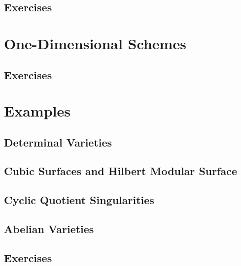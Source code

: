 \subsection{}
\subsection{}
\subsection{Exercises}

\section{One-Dimensional Schemes}

\subsection{}
\subsection{}
\subsection{}
\subsection{}
\subsection{Exercises}

\section{Examples}

\subsection{Determinal Varieties}
\subsection{Cubic Surfaces and  Hilbert Modular Surface}
\subsection{Cyclic Quotient Singularities}
\subsection{Abelian Varieties}
\subsection{Exercises}